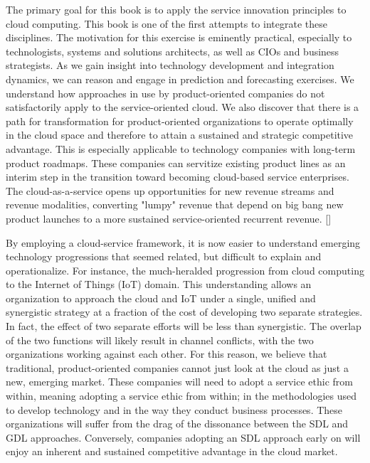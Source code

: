 The primary goal for this book is to apply the service innovation principles to cloud computing. This book is one of the first attempts to integrate these disciplines. The motivation for this exercise is eminently practical, especially to technologists, systems and solutions architects, as well as CIOs and business strategists. As we gain insight into technology development and integration dynamics, we can reason and engage in prediction and forecasting exercises. We understand how approaches in use by product-oriented companies do not satisfactorily apply to the service-oriented cloud. We also discover that there is a path for transformation for product-oriented organizations to operate optimally in the cloud space and therefore to attain a sustained and strategic competitive advantage. This is especially applicable to technology companies with long-term product roadmaps. These companies can servitize existing product lines as an interim step in the transition toward becoming cloud-based service enterprises. The cloud-as-a-service opens up opportunities for new revenue streams and revenue modalities, converting "lumpy" revenue that depend on big bang new product launches to a more sustained service-oriented recurrent revenue. [\cite{19}]
\newline

By employing a cloud-service framework, it is now easier to understand emerging technology progressions that seemed related, but difficult to explain and operationalize. For instance, the much-heralded progression from cloud computing to the Internet of Things (IoT) domain. This understanding allows an organization to approach the cloud and IoT under a single, unified and synergistic strategy at a fraction of the cost of developing two separate strategies. In fact, the effect of two separate efforts will be less than synergistic. The overlap of the two functions will likely result in channel conflicts, with the two organizations working against each other. For this reason, we believe that traditional, product-oriented companies cannot just look at the cloud as just a new, emerging market. These companies will need to adopt a service ethic from within, meaning adopting a service ethic from within; in the methodologies used to develop technology and in the way they conduct business processes. These organizations will suffer from the drag of the dissonance between the SDL and GDL approaches. Conversely, companies adopting an SDL approach early on will enjoy an inherent and sustained competitive advantage in the cloud market.
\newline
